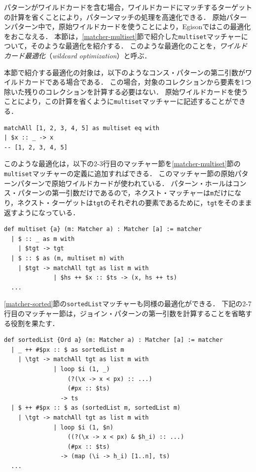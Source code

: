 パターンがワイルドカードを含む場合，ワイルドカードにマッチするターゲットの計算を省くことにより，パターンマッチの処理を高速化できる．
原始パターンパターン中で，原始ワイルドカードを使うことにより，Egisonではこの最適化をおこなえる．
本節は，\ref{matcher-multiset}節で紹介した\lstinline{multiset}マッチャーについて，そのような最適化を紹介する．
このような最適化のことを，\emph{ワイルドカード最適化}（\emph{wildcard optimization}）と呼ぶ．

本節で紹介する最適化の対象は，以下のようなコンス・パターンの第二引数がワイルドカードである場合である．
この場合，対象のコレクションから要素を1つ除いた残りのコレクションを計算する必要はない．
原始ワイルドカードを使うことにより，この計算を省くように\lstinline{multiset}マッチャーに記述することができる．
\begin{lstlisting}[language=egison]
matchAll [1, 2, 3, 4, 5] as multiset eq with
| $x :: _ -> x
-- [1, 2, 3, 4, 5]
\end{lstlisting}
このような最適化は，以下の2-3行目のマッチャー節を\ref{matcher-multiset}節の\lstinline{multiset}マッチャーの定義に追加すればできる．
このマッチャー節の原始パターンパターンで原始ワイルドカードが使われている．
パターン・ホールはコンス・パターンの第一引数だけであるので，ネクスト・マッチャーは\lstinline{m}だけになり，ネクスト・ターゲットは\lstinline{tgt}のそれぞれの要素であるために，\lstinline{tgt}をそのまま返すようになっている．
\begin{lstlisting}[language=egison]
def multiset {a} (m: Matcher a) : Matcher [a] := matcher
  | $ :: _ as m with
    | $tgt -> tgt
  | $ :: $ as (m, multiset m) with
    | $tgt -> matchAll tgt as list m with
              | $hs ++ $x :: $ts -> (x, hs ++ ts)
  ...
\end{lstlisting}

\ref{matcher-sorted}節の\lstinline{sortedList}マッチャーも同様の最適化ができる．
下記の2-7行目のマッチャー節は，ジョイン・パターンの第一引数を計算することを省略する役割を果たす．
\begin{lstlisting}[language=egison]
def sortedList {Ord a} (m: Matcher a) : Matcher [a] := matcher
  | _ ++ #$px :: $ as sortedList m
    | \tgt -> matchAll tgt as list m with
              | loop $i (1, _)
                  (?(\x -> x < px) :: ...)
                  (#px :: $ts)
                -> ts
  | $ ++ #$px :: $ as (sortedList m, sortedList m)
    | \tgt -> matchAll tgt as list m with
              | loop $i (1, $n)
                  ((?(\x -> x < px) & $h_i) :: ...)
                  (#px :: $ts)
                -> (map (\i -> h_i) [1..n], ts)
  ...
\end{lstlisting}

